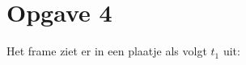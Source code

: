 \documentclass[a4paper,11pt]{article}
\begin{document}











\section*{Opgave 4}

Het frame ziet er in een plaatje als volgt $t_{1}$ uit:


\end{document}
